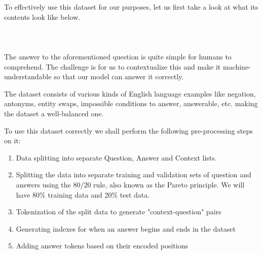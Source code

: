 \documentclass[a4paper,12pt]{report}
\begin{document}
	    To effectively use this dataset for our purposes, let us first take a look at what its contents look like below.\\ \\
	    \noindent{}
	    \\ \\

	    The answer to the aforementioned question is quite simple for humans to comprehend. The challenge is for us to contextualize this and make it machine-understandable so that our model can answer it correctly.
	
	    The dataset consists of various kinds of English language examples like negation, antonyms, entity swaps, impossible conditions to answer, answerable, etc. making the dataset a well-balanced one.
	
	    To use this dataset correctly we shall perform the following pre-processing steps on it:
	
	    \begin{enumerate}
	    	\item Data splitting into separate Question, Answer and Context lists.
	    	\item Splitting the data into separate training and validation sets of  question and answers using the 80/20 rule, also known as the Pareto principle. We will have 80\% training data and 20\% test data.
	    	\item Tokenization of the split data to generate "context-question" pairs
	    	\item Generating indexes for when an answer begins and ends in the dataset
	    	\item Adding answer tokens based on their encoded positions
	    \end{enumerate}
\end{document}
